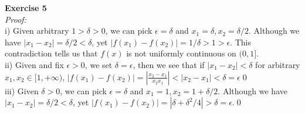 \documentclass[12pt]{article}
\begin{document}
{\bf Exercise 5}\\
{\it Proof:}\\
i) Given arbitrary $1>\delta>0$, we can pick $\epsilon=\delta$ and $x_1=\delta, x_2=\delta/2$. Although we have $|x_1-x_2|=\delta/2<\delta$, yet $|f(x_1)-f(x_2)|=1/\delta>1>\epsilon$. This contradiction tells us that $f(x)$ is not uniformly continuous on $(0,1]$.\\
ii) Given and fix $\epsilon>0$, we set $\delta=\epsilon$, then we see that if ${|x_1-x_2|<\delta}$ for arbitrary $x_1, x_2\in [1,+\infty)$, $\displaystyle|f(x_1)-f(x_2)|=|\frac{x_2-x_1}{x_2x_1}|<|x_2-x_1|<\delta=\epsilon$\qed\\
iii) Given $\delta>0$, we can pick $\epsilon=\delta$ and $x_1=1, x_2=1+\delta/2$. Although we have $|x_1-x_2|=\delta/2<\delta$, yet $|f(x_1)-f(x_2)|=|\delta+\delta^2/4|>\delta=\epsilon$.\qed
\eject
\end{document}

